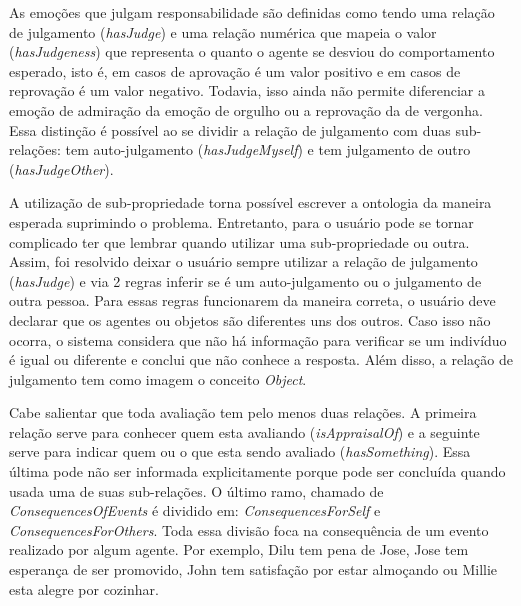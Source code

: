 As emoções que julgam responsabilidade são definidas como tendo uma relação de
julgamento (\emph{hasJudge}) e uma relação numérica que mapeia o valor
(\emph{hasJudgeness}) que representa o quanto o agente se desviou do
comportamento esperado, isto é, em casos de aprovação é um valor positivo e em
casos de reprovação é um valor negativo. Todavia, isso ainda não permite
diferenciar a emoção de admiração da emoção de orgulho ou a reprovação da de
vergonha. Essa distinção é possível ao se dividir a relação de julgamento com
duas sub-relações: tem auto-julgamento (\emph{hasJudgeMyself}) e tem
julgamento de outro (\emph{hasJudgeOther}).

A utilização de sub-propriedade torna possível escrever a ontologia da maneira
esperada suprimindo o problema. Entretanto, para o usuário pode se tornar
complicado ter que lembrar quando utilizar uma sub-propriedade ou outra.
Assim, foi resolvido deixar o usuário sempre utilizar a relação de julgamento
(\emph{hasJudge}) e via 2 regras inferir se é um auto-julgamento ou o
julgamento de outra pessoa. Para essas regras funcionarem da maneira correta,
o usuário deve declarar que os agentes ou objetos são diferentes uns dos
outros. Caso isso
não ocorra, o sistema considera que não há informação para verificar se um
indivíduo é igual ou diferente e conclui que não conhece a resposta. Além
disso, a relação de julgamento tem como imagem o conceito \emph{Object}.

Cabe salientar que toda avaliação tem pelo menos duas relações. A primeira
relação serve para conhecer quem esta avaliando (\emph{isAppraisalOf}) e a
seguinte serve para indicar quem ou o que esta sendo avaliado
(\emph{hasSomething}). Essa última pode não ser informada explicitamente porque pode
ser concluída quando usada uma de suas sub-relações. O último ramo, chamado de
\emph{ConsequencesOfEvents} é dividido em: \emph{ConsequencesForSelf} e
\emph{ConsequencesForOthers}. Toda essa divisão foca na consequência de um
evento realizado por algum agente. Por exemplo, Dilu tem pena
de Jose, Jose tem esperança de ser promovido, John tem satisfação por
estar almoçando ou Millie esta alegre por cozinhar.

